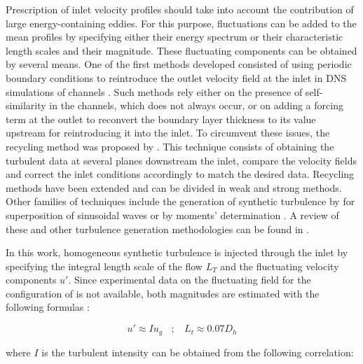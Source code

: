 
Prescription of inlet velocity profiles should take into account the contribution of large energy-containing eddies. For this purpose, fluctuations can be added to the mean profiles by specifying either their energy spectrum or their characteristic length scales and their magnitude. These fluctuating components can be obtained by several means. One of the first methods developed consisted of using periodic boundary conditions to reintroduce the outlet velocity field at the inlet in DNS simulations of channels . Such methods rely either on the presence of self-similarity in the channels, which does not always occur, or on adding a forcing term at the outlet to reconvert the boundary layer thickness to its value upstream for reintroducing it into the inlet. To circumvent these issues, the recycling method was proposed by . This technique consists of obtaining the turbulent data at several planes downstream the inlet, compare the velocity fields and correct the inlet conditions accordingly to match the desired data. Recycling methods have been extended and can be divided in weak and strong methods. Other families of techniques include the generation of synthetic turbulence by for superposition of sinusoidal waves  or by moments' determination . A review of these and other turbulence generation methodologies can be found in \citeColor[wu_inflow_2017].

In this work, homogeneous synthetic turbulence is injected through the inlet by specifying the integral length scale of the flow $L_T$ and the fluctuating velocity components $u'$. Since experimental data on the fluctuating field for the configuration of  is not available, both magnitudes are estimated with the following formulas :

\begin{equation}
u' \approx I u_g  ~~~~ ; ~~~~ L_t \approx 0.07 D_h
\end{equation}

where $I$ is the turbulent intensity can be obtained from the following correlation:

